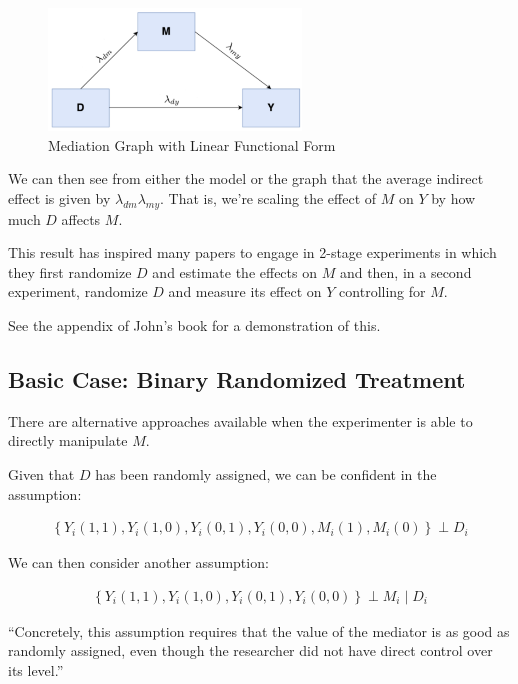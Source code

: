 \documentclass[10pt]{article}
\begin{document}
\begin{figure}[!htb]
    \centering
        \includegraphics[width=0.6\textwidth]{../input/med_func_form_fig.png}
    \caption{Mediation Graph with Linear Functional Form}
    \label{fig:med_func_form_fig}
\end{figure}

We can then see from either 
the model or the graph that the average indirect 
effect is given by $\lambda_{d m} \lambda_{my}$.
That is, we're scaling the effect of $M$ on $Y$
by how much $D$ affects $M$.

This result has inspired 
many papers to engage in 2-stage experiments 
in which they first randomize $D$ and estimate 
the effects on $M$ and then, in a second 
experiment, randomize
$D$ and measure its effect on $Y$ controlling for 
$M$.

See the appendix of John's book for a demonstration of this.

\subsection{Basic Case: Binary Randomized Treatment}

There are alternative approaches available 
when the experimenter is able to directly manipulate $M$.

Given that
$D$ has been randomly assigned, 
we can be confident in the assumption:

\begin{notes}
    \begin{align}
        \left\{Y_i(1,1), Y_i(1,0), Y_i(0,1), Y_i(0,0), M_i(1), M_i(0)\right\} \perp D_i
    \end{align}
\end{notes}

We can then consider another assumption:

\begin{notes}
    \begin{align}
        \left\{Y_i(1,1), Y_i(1,0), Y_i(0,1), Y_i(0,0)\right\} \perp M_i \mid D_i
    \end{align}

    ``Concretely, this assumption requires that the value of 
    the mediator is as good as randomly assigned, 
    even though the researcher did not have direct 
    control over its level.''
\end{notes}
\end{document}
